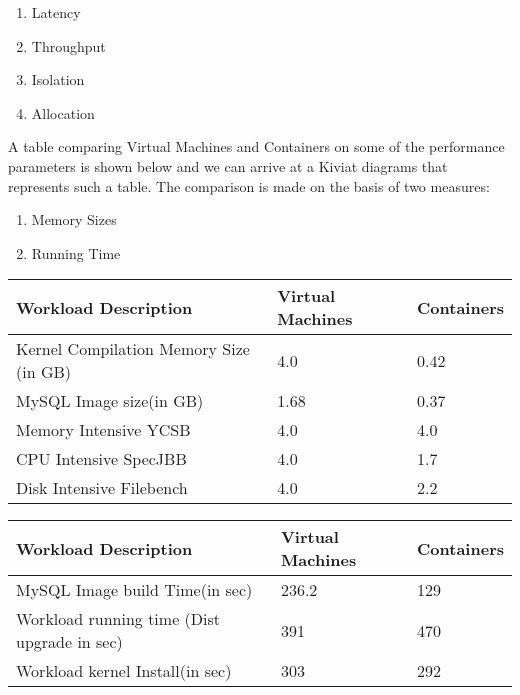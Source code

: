 \begin{enumerate}
    \item Latency
    \item Throughput
    \item Isolation
    \item Allocation
\end{enumerate}

A table comparing Virtual Machines and Containers on some of the performance parameters is shown below and we can arrive at a Kiviat diagrams that represents such a table.
The comparison is made on the basis of two measures:
\begin{enumerate}
    \item Memory Sizes
    \item Running Time
\end{enumerate}


\begin{longtable}[H]{|p{}|p{}|p{}|}
\hline\hline
Workload Description&Virtual Machines&Containers\\
\hline\hline
\hline
Kernel Compilation Memory Size (in GB)&4.0&0.42\\
\hline
MySQL Image size(in GB)&1.68&0.37\\
\hline
Memory Intensive YCSB&4.0&4.0\\
\hline
CPU Intensive SpecJBB&4.0&1.7\\
\hline
Disk Intensive Filebench&4.0&2.2\\
\hline
\hline\hline
\end{longtable}


\begin{longtable}[H]{|p{}|p{}|p{}|}
\hline\hline
Workload Description&Virtual Machines&Containers\\
\hline\hline
\hline
MySQL Image build Time(in sec)&236.2&129\\
\hline
Workload running time (Dist upgrade in sec)&391&470\\
\hline
Workload kernel Install(in sec)&303&292\\
\hline
\hline\hline
\end{longtable}

